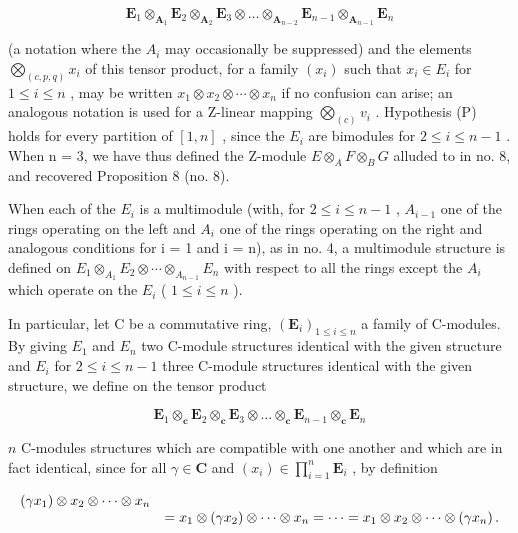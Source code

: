 \[
\mathbf {E} _ {1} \otimes_ {\mathbf {A} _ {1}} \mathbf {E} _ {2} \otimes_ {\mathbf {A} _ {2}} \mathbf {E} _ {3} \otimes \dots \otimes_ {\mathbf {A} _ {n - 2}} \mathbf {E} _ {n - 1} \otimes_ {\mathbf {A} _ {n - 1}} \mathbf {E} _ {n}\tag{33}
\]

(a notation where the \(A_{i}\) may occasionally be suppressed) and the elements \(\bigotimes_{(c,p,q)} x_{i}\) of this tensor product, for a family \((x_{i})\) such that \(x_{i} \in E_{i}\) for \(1 \leqslant i \leqslant n\) , may be written \(x_{1} \otimes x_{2} \otimes \cdots \otimes x_{n}\) if no confusion can arise; an analogous notation is used for a Z-linear mapping \(\bigotimes_{(c)} v_{i}\) . Hypothesis (P) holds for every partition of \([1,n]\) , since the \(E_{i}\) are bimodules for \(2 \leqslant i \leqslant n - 1\) . When n = 3, we have thus defined the Z-module \(E \otimes_{A} F \otimes_{B} G\) alluded to in no. 8, and recovered Proposition 8 (no. 8).

When each of the \(E_{i}\) is a multimodule (with, for \(2 \leqslant i \leqslant n - 1\) , \(A_{i-1}\) one of the rings operating on the left and \(A_{i}\) one of the rings operating on the right and analogous conditions for i = 1 and i = n), as in no. 4, a multimodule structure is defined on \(E_{1} \otimes_{A_1} E_{2} \otimes \cdots \otimes_{A_{n-1}} E_{n}\) with respect to all the rings except the \(A_{i}\) which operate on the \(E_{i}\) ( \(1 \leqslant i \leqslant n\) ).

In particular, let C be a commutative ring, \((\mathbf{E}_{i})_{1\leqslant i\leqslant n}\) a family of C-modules. By giving \(E_{1}\) and \(E_{n}\) two C-module structures identical with the given structure and \(E_{i}\) for \(2\leqslant i\leqslant n-1\) three C-module structures identical with the given structure, we define on the tensor product

\[
\mathbf {E} _ {1} \otimes_ {\mathbf {c}} \mathbf {E} _ {2} \otimes_ {\mathbf {c}} \mathbf {E} _ {3} \otimes \dots \otimes_ {\mathbf {c}} \mathbf {E} _ {n - 1} \otimes_ {\mathbf {c}} \mathbf {E} _ {n}\tag{34}
\]

\(n\) C-modules structures which are compatible with one another and which are in fact identical, since for all \(\gamma \in \mathbf{C}\) and \((x_{i})\in \prod_{i = 1}^{n}\mathbf{E}_{i}\) , by definition

\[
\begin{array}{r l} \left(\gamma x _ {1}\right) \otimes x _ {2} \otimes \dots \otimes x _ {n} \\ & = x _ {1} \otimes \left(\gamma x _ {2}\right) \otimes \dots \otimes x _ {n} = \dots = x _ {1} \otimes x _ {2} \otimes \dots \otimes \left(\gamma x _ {n}\right). \end{array}
\]

